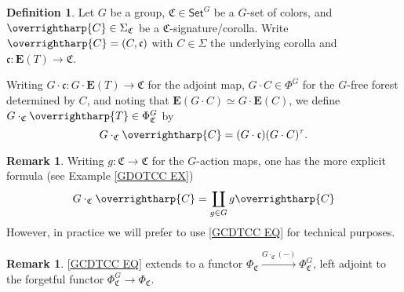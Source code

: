 \documentclass[a4paper,10pt
,draft
]{article}%
\numberwithin{equation}{section}
\numberwithin{figure}{section}
\theoremstyle{definition} %
\newtheorem{definition}[equation]{Definition}%
\newtheorem{remark}[equation]{Remark}%
\newcommand{\vect}[1]{\text{\overrightharp{\ensuremath{#1}}}}
\newcommand{\1}{\ensuremath{\mathbbm 1}}%
\begin{document}
\begin{definition}
Let $G$ be a group,
$\mathfrak{C} \in \mathsf{Set}^G$
be a $G$-set of colors, 
and $\vect{C} \in \Sigma_{\mathfrak{C}}$ be a $\mathfrak{C}$-signature/corolla.
Write
$\vect{C} = (C,\mathfrak{c})$
with $C\in \Sigma$ the underlying corolla
and 
$\mathfrak{c} \colon \boldsymbol{E}(T) \to \mathfrak{C}$.

Writing 
$G \cdot \mathfrak{c} \colon G \cdot \boldsymbol{E}(T) \to \mathfrak{C}$
for the adjoint map, 
$G \cdot C \in \Phi^G$
for the $G$-free forest determined by $C$,
and noting that
$\boldsymbol{E}(G \cdot C) \simeq 
G \cdot \boldsymbol{E}(C)$,
we define $G \cdot_{\mathfrak{C}} \vect{T} \in \Phi^G_{\mathfrak{C}}$ by
\begin{equation}\label{GCDTCC EQ}
G \cdot_{\mathfrak{C}} \vect{C} = 
(G \cdot \mathfrak{c})(G \cdot C)^{\tau}.
\end{equation}
\end{definition}



\begin{remark}
Writing $g \colon \mathfrak{C} \to \mathfrak{C}$
for the $G$-action maps,
one has the more explicit formula 
(see Example \ref{GDOTCC EX})
\[
G \cdot_{\mathfrak{C}} \vect{C}
= 
\coprod_{g \in G}
g \vect{C}
\]
However, in practice we will prefer to use 
\eqref{GCDTCC EQ} for technical purposes.
\end{remark}


\begin{remark}
\eqref{GCDTCC EQ}
extends to a functor
$\Phi_{\mathfrak{C}}
\xrightarrow{G \cdot_{\mathfrak{C}} (-)}
\Phi_{\mathfrak{C}}^G$,
left adjoint to the forgetful functor
$ \Phi_{\mathfrak{C}}^G
\to \Phi_{\mathfrak{C}}$.
\end{remark}
\end{document}
